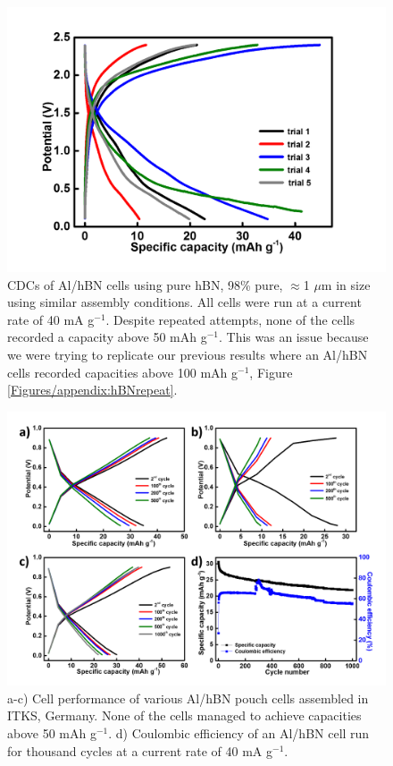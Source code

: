 \begin{figure}[tbh!]
\centering
\includegraphics[width=\textwidth]{Figures/appendix/hBNmultiattempts}
\caption{CDCs of Al/hBN cells using pure hBN, 98\% pure, $\approx$1 $\mu$m in size using similar assembly conditions. All cells were run at a current rate of 40 mA g$^{-1}$. Despite repeated attempts, none of the cells recorded a capacity above 50 mAh g$^{-1}$. This was an issue because we were trying to replicate our previous results where an Al/hBN cells recorded capacities above 100 mAh g$^{-1}$, Figure \ref{Figures/appendix:hBNrepeat}.}
\label{Figures/appendix:hBNmultiattempts}
\end{figure}
\begin{figure}[tbh!]
\centering
\includegraphics[width=\textwidth]{Figures/appendix/pouchcellCDCCE}
\caption{a-c) Cell performance of various Al/hBN pouch cells assembled in ITKS, Germany. None of the cells managed to achieve capacities above 50 mAh g$^{-1}$. d) Coulombic efficiency of an Al/hBN cell run for thousand cycles at a current rate of 40 mA g$^{-1}$. }
\label{Figures/appendix:pouchcellCDCCE}
\end{figure}
